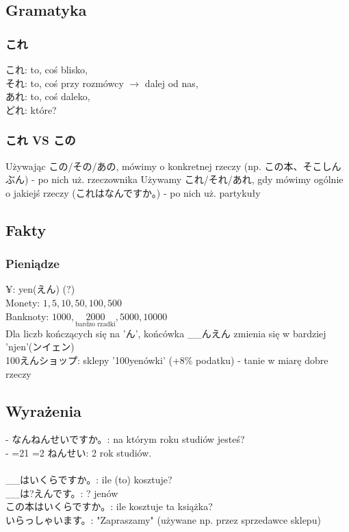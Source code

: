 \documentclass[10pt, a4paper]{article}
\def\isFurigana{1}
\newcommand{\fur}[3][2]{\ifnum2=#1\if\isFurigana1
			\ruby{#2}{#3}
		\else
			#2
		\fi
	\else
		\ifnum1=#1
			\ruby{#2}{#3}
		\else
			#2
		\fi
	\fi
}
\begin{document}
	\subsection{Gramatyka}
	\subsubsection{これ}
	これ: to, coś blisko, \\
	それ: to, coś przy rozmówcy $\to$ dalej od nas, \\
	あれ: to, coś daleko, \\
	どれ: które?
	\subsubsection{これ VS この}
	Używając この/その/あの, mówimy o konkretnej rzeczy (np. この本、そこしんぶん) - po nich uż. rzeczownika
	Używamy これ/それ/あれ, gdy mówimy ogólnie o jakiejś rzeczy (これはなんですか。) - po nich uż. partykuły
	\subsection{Fakty}
	\subsubsection{Pieniądze}
	¥: yen(えん) (?)\\
	Monety: $1, 5, 10, 50, 100, 500$ \\
	Banknoty: $1000, \underset{\text{bardzo rzadki}}{2000}, 5000, 10000$ \\
	Dla liczb kończących się na 'ん', końcówka \_\_んえん zmienia się w bardziej 'njen'(ンイェン) \\
	100えんショップ: sklepy '100yenówki' (+8\% podatku) - tanie w miarę dobre rzeczy
	\subsection{Wyrażenia}
	 - なんねんせいですか。: na którym roku studiów jesteś?　\\
	 - \fur{2}{に}ねんせい: 2 rok studiów. \\\\
	 \_\_はいくらですか。: ile (to) kosztuje? \\
	 \_\_は?えんです。: ? jenów \\
	 この本はいくらですか。: ile kosztuje ta książka? \\
	 いらっしゃいます。: "Zapraszamy" (używane np. przez sprzedawce sklepu)
	 
\end{document}
